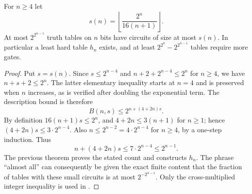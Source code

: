 \begin{theorem}\label{thm:R11}
For $n\geq4$ let
\[
 s(n)=\left\lfloor\frac{2^n}{16(n+1)}\right\rfloor.
\]
At most $2^{2^{n-1}}$ truth tables on $n$ bits have circuits of size at most
$s(n)$. In particular a least hard table $h_n$ exists, and at least
$2^{2^n}-2^{2^{n-1}}$ tables require more gates.
\end{theorem}
\begin{proof}
Put $s=s(n)$. Since $s\leq2^{n-4}$ and
$n+2+2^{n-4}\leq2^n$ for $n\geq4$, we have $n+s+2\leq2^n$.
The latter elementary inequality starts at $n=4$ and is preserved when
$n$ increases, as is verified after doubling the exponential term.
The description bound is therefore
\[
 B(n,s)\leq2^{n+(4+2n)s}.
\]
By definition $16(n+1)s\leq2^n$, and $4+2n\leq3(n+1)$ for $n\geq1$;
hence $(4+2n)s\leq3\cdot2^{n-4}$. Also
$n\leq2^{n-2}=4\cdot2^{n-4}$ for $n\geq4$, by a one-step induction.
Thus
\[
 n+(4+2n)s\leq7\cdot2^{n-4}\leq2^{n-1}.
\]
The previous theorem proves the stated count and constructs $h_n$.
The phrase ``almost all'' can consequently be given the exact finite
content that the fraction of tables with these small circuits is at most
$2^{-2^{n-1}}$. Only the cross-multiplied integer inequality is used in
\ipra.
\end{proof}

